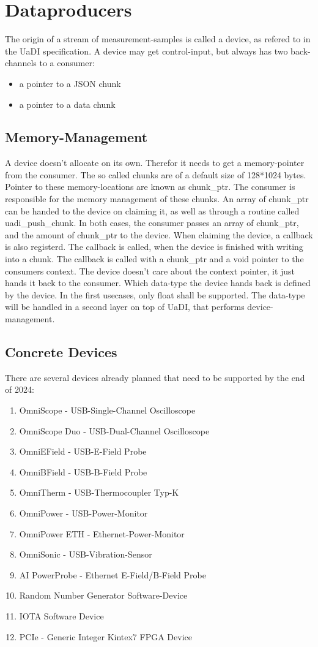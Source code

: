 \chapter{Dataproducers}
The origin of a stream of measurement-samples is called a device, as refered to in the UaDI specification. 
A device may get control-input, but always has two back-channels to a consumer:
\begin{itemize}
    \item a pointer to a JSON chunk
    \item a pointer to a data chunk
\end{itemize}
\section{Memory-Management}
A device doesn't allocate on its own.
Therefor it needs to get a memory-pointer from the consumer.
The so called chunks are of a default size of 128*1024 bytes.
Pointer to these memory-locations are known as chunk\_ptr.
The consumer is responsible for the memory management of these chunks.
An array of chunk\_ptr can be handed to the device on claiming it, as well as through a routine called uadi\_push\_chunk.
In both cases, the consumer passes an array of chunk\_ptr, and the amount of chunk\_ptr to the device.
When claiming the device, a callback is also registerd. 
The callback is called, when the device is finished with writing into a chunk.
The callback is called with a chunk\_ptr and a void pointer to the consumers context. 
The device doesn't care about the context pointer, it just hands it back to the consumer.
Which data-type the device hands back is defined by the device. 
In the first usecases, only float shall be supported. 
The data-type will be handled in a second layer on top of UaDI, that performs device-management.

\section{Concrete Devices}
There are several devices already planned that need to be supported by the end of 2024:
\begin{enumerate}
    \item OmniScope - USB-Single-Channel Oscilloscope
    \item OmniScope Duo - USB-Dual-Channel Oscilloscope
    \item OmniEField - USB-E-Field Probe
    \item OmniBField - USB-B-Field Probe
    \item OmniTherm - USB-Thermocoupler Typ-K 
    \item OmniPower - USB-Power-Monitor
    \item OmniPower ETH - Ethernet-Power-Monitor
    \item OmniSonic - USB-Vibration-Sensor
    \item AI PowerProbe - Ethernet E-Field/B-Field Probe 
    \item Random Number Generator Software-Device
    \item IOTA Software Device 
    \item PCIe - Generic Integer Kintex7 FPGA Device
\end{enumerate}
